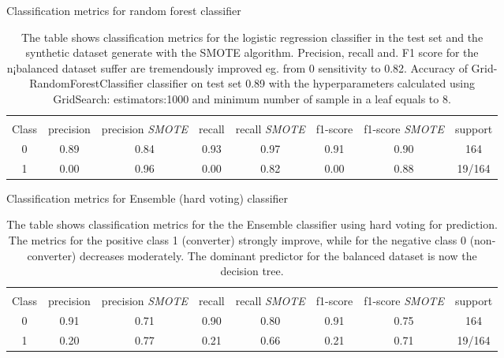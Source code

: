 \documentclass[11pt]{article}
\theoremstyle{definition}
\theoremstyle{remark}
\begin{document}


\begin{table}[H]
\caption{Classification metrics for random forest classifier} \label{tab:rf_smote} 
\begin{center} 
\begin{tabular}{cccccccc}
\hline
\multicolumn{1}{c}{} \\
Class & precision & precision \textit{SMOTE}& recall & recall \textit{SMOTE}& f1-score & f1-score \textit{SMOTE} & support     \\
\hline
0 & 0.89 & 0.84  &  0.93 & 0.97 &  0.91   & 0.90  &  164 \\
1 & 0.00  & 0.96  & 0.00   & 0.82 &  0.00   & 0.88   & 19/164 \\
\hline
\end{tabular}
\caption{The table shows classification metrics for the logistic regression classifier in the test set and the synthetic dataset generate with the SMOTE algorithm. Precision, recall and. F1 score for the n¡balanced dataset suffer are tremendously improved eg. from 0 sensitivity to 0.82. Accuracy of Grid-RandomForestClassifier classifier on test set 0.89 with the hyperparameters calculated using GridSearch: estimators:1000 and minimum number of sample in a leaf equals to 8.}
\end{center}
\end{table}

\begin{table}[H]
\caption{Classification metrics for Ensemble (hard voting) classifier} \label{tab:voting_smote} 
\begin{center} 
\begin{tabular}{cccccccc}
\hline
\multicolumn{1}{c}{} \\
Class & precision & precision \textit{SMOTE}& recall & recall \textit{SMOTE}& f1-score & f1-score \textit{SMOTE} & support     \\
\hline
0 & 0.91  & 0.71  &  0.90  & 0.80 &  0.91   &  0.75&  164 \\
1 & 0.20  & 0.77 &  0.21  & 0.66 &  0.21   &  0.71  & 19/164 \\
\hline
\end{tabular}
\caption{The table shows classification metrics for the  the Ensemble classifier using hard voting for prediction. The metrics for the positive class 1 (converter) strongly improve, while for the negative class 0 (non-converter) decreases moderately. The dominant predictor for the balanced dataset is now the decision tree.}
\end{center}
\end{table}
\end{document}
